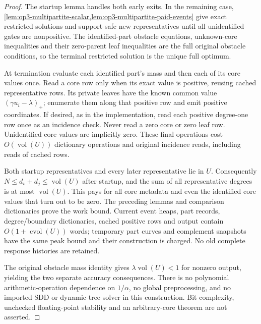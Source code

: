 \begin{proof}
The startup lemma handles both early exits. In the remaining case,
\cref{lem:op3-multipartite-scalar,lem:op3-multipartite-paid-events} give
exact restricted solutions and support-safe new representatives until all
unidentified gates are nonpositive. The identified-part obstacle equations,
unknown-core inequalities and their zero-parent leaf inequalities are the
full original obstacle conditions, so the terminal restricted solution is
the unique full optimum.

At termination evaluate each identified part's mass and then each of its
core values once. Read a core row only when its exact value is positive,
reusing cached representative rows. Its private leaves have the known
common value $(\gamma u_i-\lambda)_+$; enumerate them along that positive
row and emit positive coordinates. If desired, as in the implementation,
read each positive degree-one row once as an incidence check. Never read a
zero core or zero leaf row. Unidentified core values are implicitly zero.
These final operations cost $O(\operatorname{vol}(U))$ dictionary operations
and original incidence reads, including reads of cached rows.

Both startup representatives and every later representative lie in $U$.
Consequently $N\leq d_v+d_j\leq\operatorname{vol}(U)$ after startup,
and the sum of all representative degrees is at most
$\operatorname{vol}(U)$. This pays for all core metadata and even the
identified core values that turn out to be zero. The preceding lemmas
and comparison dictionaries prove the work bound. Current event heaps,
part records, degree/boundary dictionaries, cached positive rows and output
contain $O(1+\operatorname{cvol}(U))$ words; temporary part curves and
complement snapshots have the same peak bound and their construction is
charged. No old complete response histories are retained.

The original obstacle mass identity gives
$\lambda\operatorname{vol}(U)<1$ for nonzero output, yielding the two
separate accuracy consequences. There is no polynomial arithmetic-operation
dependence on $1/\alpha$, no global preprocessing, and no imported SDD or
dynamic-tree solver in this construction. Bit complexity, unchecked
floating-point stability and an arbitrary-core theorem are not asserted.
\end{proof}

